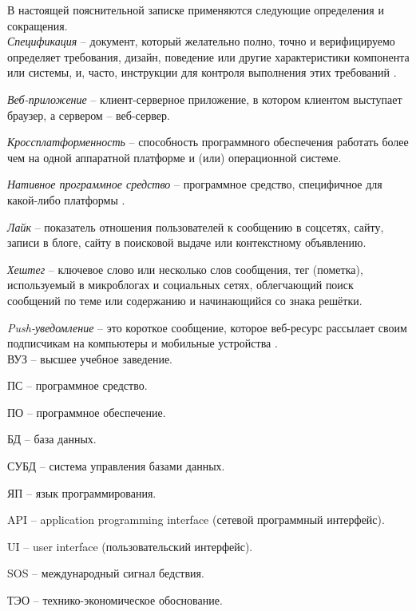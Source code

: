 \label{sec:definitions}

В настоящей пояснительной записке применяются следующие определения и сокращения.
\\

\emph{Спецификация} -- документ, который желательно полно, точно и верифицируемо определяет требования, дизайн, поведение или другие характеристики компонента или системы, и, часто, инструкции для контроля выполнения этих требований \cite{istqbSpecification}.

\emph{Веб-приложение} -- клиент-серверное приложение, в котором клиентом выступает браузер, а сервером -- веб-сервер.

\emph{Кроссплатформенность} -- способность программного обеспечения работать более чем на одной аппаратной платформе и (или) операционной системе.

\emph{Нативное программное средство} -- программное средство, специфичное для какой-либо платформы \cite{crossplatform}.

\emph{Лайк} -- показатель отношения пользователей к сообщению в соцсетях, сайту, записи в блоге, сайту в поисковой выдаче или контекстному объявлению.

\emph{Хештег} -- ключевое слово или несколько слов сообщения, тег (пометка), используемый в микроблогах и социальных сетях, облегчающий поиск сообщений по теме или содержанию и начинающийся со знака решётки.

\emph{Push-уведомление} -- это короткое сообщение, которое веб-ресурс рассылает своим подписчикам на компьютеры и мобильные устройства \cite{pushNotification}.
\\

ВУЗ -- высшее учебное заведение.

ПС -- программное средство.

ПО -- программное обеспечение.

БД -- база данных.

СУБД -- система управления базами данных.

ЯП -- язык программирования.

API -- application programming interface (сетевой программный интерфейс).

UI -- user interface (пользовательский интерфейс).

SOS -- международный сигнал бедствия.

ТЭО -- технико-экономическое обоснование.


\label{sec:introduction}


